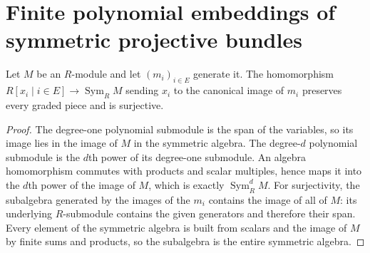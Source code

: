 \section{Finite polynomial embeddings of symmetric projective bundles}

\begin{lemma}
\label{lem:fc-symmetric-polynomial-presentation}
\leanok
{}
Let $M$ be an $R$-module and let $(m_i)_{i\in E}$ generate it.
The homomorphism $R[x_i\mid i\in E]\to\operatorname{Sym}_R M$
sending $x_i$ to the canonical image of $m_i$ preserves every graded
piece and is surjective.
\end{lemma}
\begin{proof}
The degree-one polynomial submodule is the span of the variables, so
its image lies in the image of $M$ in the symmetric algebra.  The
degree-$d$ polynomial submodule is the $d$th power of its degree-one
submodule.  An algebra homomorphism commutes with products and scalar
multiples, hence maps it into the $d$th power of the image of $M$,
which is exactly $\operatorname{Sym}^d_R M$.  For surjectivity, the
subalgebra generated by the images of the $m_i$ contains the image of
all of $M$: its underlying $R$-submodule contains the given generators
and therefore their span.  Every element of the symmetric algebra is
built from scalars and the image of $M$ by finite sums and products,
so the subalgebra is the entire symmetric algebra.
\end{proof}


